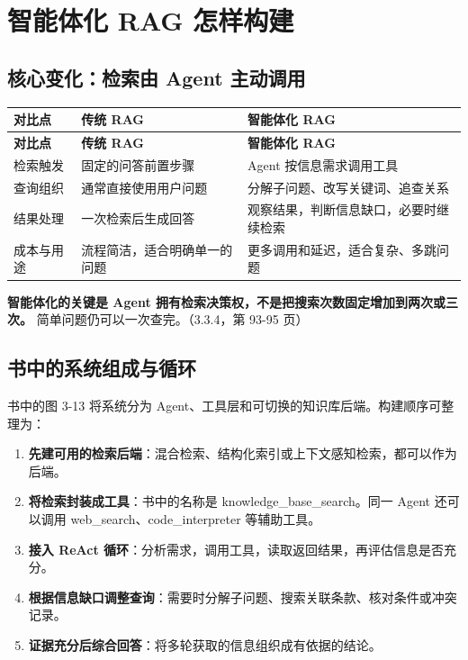 \documentclass[UTF8,a4paper,11pt]{ctexart}
\newlength{\tableusable}
\newcommand{\code}[1]{{\small\ttfamily #1}}
\begin{document}
\section{智能体化 RAG 怎样构建}

\subsection{核心变化：检索由 Agent 主动调用}

\begingroup\small
\setlength{\tableusable}{\dimexpr\linewidth-4\tabcolsep\relax}
\begin{longtable}{@{}>{\raggedright\arraybackslash}p{0.2\tableusable}>{\raggedright\arraybackslash}p{0.36\tableusable}>{\raggedright\arraybackslash}p{0.44\tableusable}@{}}
\toprule
\textbf{对比点} & \textbf{传统 RAG} & \textbf{智能体化 RAG} \\
\midrule\endfirsthead
\toprule
\textbf{对比点} & \textbf{传统 RAG} & \textbf{智能体化 RAG} \\
\midrule\endhead
\bottomrule\endfoot
检索触发 & 固定的问答前置步骤 & Agent 按信息需求调用工具 \\
查询组织 & 通常直接使用用户问题 & 分解子问题、改写关键词、追查关系 \\
结果处理 & 一次检索后生成回答 & 观察结果，判断信息缺口，必要时继续检索 \\
成本与用途 & 流程简洁，适合明确单一的问题 & 更多调用和延迟，适合复杂、多跳问题 \\
\end{longtable}\endgroup

\textbf{智能体化的关键是 Agent 拥有检索决策权，不是把搜索次数固定增加到两次或三次。} 简单问题仍可以一次查完。（3.3.4，第 93-95 页）

\subsection{书中的系统组成与循环}

书中的图 3-13 将系统分为 Agent、工具层和可切换的知识库后端。构建顺序可整理为：

\begin{enumerate}
\item \textbf{先建可用的检索后端}：混合检索、结构化索引或上下文感知检索，都可以作为后端。
\item \textbf{将检索封装成工具}：书中的名称是 \code{knowledge\_\allowbreak base\_\allowbreak search}。同一 Agent 还可以调用 \code{web\_\allowbreak search}、\code{code\_\allowbreak interpreter} 等辅助工具。
\item \textbf{接入 ReAct 循环}：分析需求，调用工具，读取返回结果，再评估信息是否充分。
\item \textbf{根据信息缺口调整查询}：需要时分解子问题、搜索关联条款、核对条件或冲突记录。
\item \textbf{证据充分后综合回答}：将多轮获取的信息组织成有依据的结论。
\end{enumerate}
\end{document}
